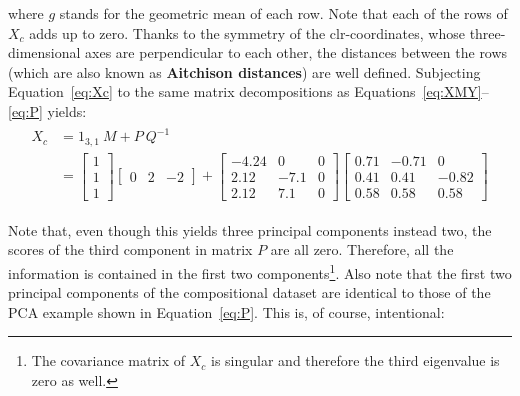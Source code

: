\noindent where $g$ stands for the geometric mean of each row. Note
that each of the rows of $X_c$ adds up to zero. Thanks to the symmetry
of the clr-coordinates, whose three-dimensional axes are perpendicular
to each other, the distances between the rows (which are also known as
\textbf{Aitchison distances}) are well defined. Subjecting
Equation~\ref{eq:Xc} to the same matrix decompositions as
Equations~\ref{eq:XMY}--\ref{eq:P} yields:
\begin{align}
  \begin{split}
    X_c & = 1_{3,1}~M + P~Q^{-1} \\
    ~ & = 
    \left[
      \begin{array}{c}
        1 \\
        1 \\
        1
      \end{array}
      \right]
   \left[
    \begin{array}{ccc}
        0 & 2 & -2
      \end{array}
      \right]
    + 
     \left[
      \begin{array}{ccc}
        -4.24 &  0   & 0 \\
        2.12  & -7.1 & 0 \\
        2.12  &  7.1 & 0
      \end{array}
      \right]
    \left[
      \begin{array}{ccc}
        0.71 & -0.71 &  0 \\
        0.41 &  0.41 & -0.82 \\
        0.58 &  0.58 &  0.58
      \end{array}
      \right]
    \label{eq:PCAcomp}
  \end{split}
\end{align}

Note that, even though this yields three principal components instead
two, the scores of the third component in matrix $P$ are all zero.
Therefore, all the information is contained in the first two
components\footnote{The covariance matrix of $X_c$ is singular and
therefore the third eigenvalue is zero as well.}. Also note that the
first two principal components of the compositional dataset are
identical to those of the PCA example shown in
Equation~\ref{eq:P}. This is, of course, intentional:

